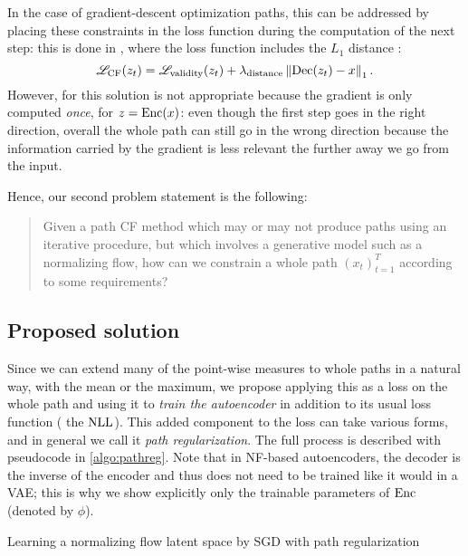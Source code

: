 \documentclass[../main.tex]{subfiles}
\begin{document}
In the case of gradient-descent optimization paths, this can be addressed by placing these constraints in the loss function during the computation of the next step: this is done in \revise{}, where the loss function includes the $L_1$ distance \cite{joshiRealistic2019}:
\begin{equation*}
\mathscr{L}_\text{CF}(z_t) = \mathscr{L}_\text{validity}(z_t) + \lambda_\text{distance} \left\lVert\operatorname{Dec}(z_t) - x\right\rVert_1.
\end{equation*}
However, for \ls{} this solution is not appropriate because the gradient is only computed \emph{once}, for $z = \operatorname{Enc}(x)$: even though the first step goes in the right direction, overall the whole path can still go in the wrong direction because the information carried by the gradient is less relevant the further away we go from the input.

Hence, our second problem statement is the following:
\begin{quote}
Given a path CF method which may or may not produce paths using an iterative procedure, but which involves a generative model such as a normalizing flow,
how can we constrain a whole path $(x_t)_{t=1}^T$ according to some requirements?
\end{quote}

\subsection{Proposed solution}

Since we can extend many of the point-wise measures to whole paths in a natural way, \eg{} with the mean or the maximum, we propose applying this as a loss on the whole path and using it to \emph{train the autoencoder} in addition to its usual loss function (\eg{} the $\text{NLL}$).
This added component to the loss can take various forms, and in general we call it \emph{path regularization}.
The full process is described with pseudocode in \autoref{algo:pathreg}.
Note that in NF-based autoencoders, the decoder is the inverse of the encoder and thus does not need to be trained like it would in a VAE; this is why we show explicitly only the trainable parameters of $\operatorname{Enc}$ (denoted by $\phi$).

\begin{algorithm}
\caption{Learning a normalizing flow latent space by SGD with path regularization}
\label{algo:pathreg}
\end{algorithm}
\end{document}
